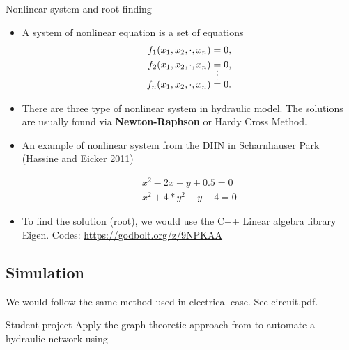 \documentclass[xcolor=dvipsnames]{beamer}
\begin{document}
\begin{frame}[shrink=20]{Nonlinear system and root finding}

\begin{itemize}
	\item A system of nonlinear equation is a set of equations 
	\begin{align*}
		f_1(x_1,x_2,\cdot,x_n)&=0,\\
		f_2(x_1,x_2,\cdot,x_n)&=0,\\
		&\shortvdotswithin{=}
		f_n(x_1,x_2,\cdot,x_n)&=0.
	\end{align*}
	\item There are three type of nonlinear system in hydraulic model. The solutions are usually found via 
	\textbf{Newton-Raphson} or Hardy Cross Method.

	\item An example of nonlinear system from the DHN in Scharnhauser Park (Hassine and Eicker 2011)

	\begin{align*}
		x^2-2x-y+0.5=0\\
		x^2+4*y^2-y-4=0
	\end{align*}

	\item To find the solution (root), we would use the C++ Linear algebra library {\color{purple}Eigen}.  %
	Codes: \url{https://godbolt.org/z/9NPKAA}

\end{itemize}
\end{frame}

\subsection{Simulation}

\begin{frame}
	We would follow the same method used in electrical case. See circuit.pdf.
\end{frame}

\begin{frame}{Student project}
	Apply the graph-theoretic approach from  to automate a hydraulic network using\href{Using graph theory for automated electric circuit solving}{}
\end{frame}
\end{document}
